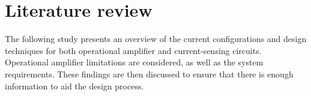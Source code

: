 \chapter{Literature review}\label{chap:Lit}

The following study presents an overview of the current configurations and design techniques for both operational amplifier and current-sensing circuits.
Operational amplifier limitations are considered, as well as the system requirements. These findings are then discussed to ensure that there is
enough information to aid the design process.





